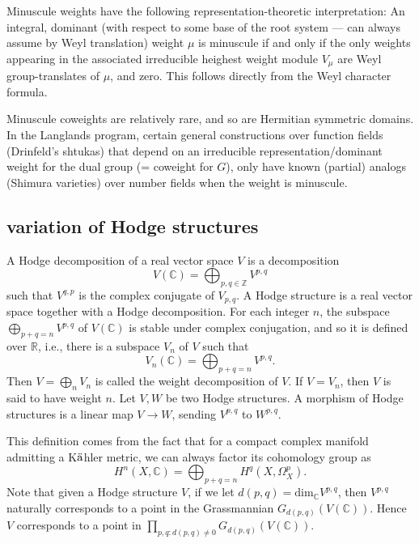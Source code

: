 \begin{remark}
 \label{remark-minuscule-coweight}
Minuscule weights have the following representation-theoretic interpretation: An integral, dominant (with respect to some base of the root system --- can always assume by Weyl translation) weight $\mu$ is minuscule if and only if the only weights appearing in the associated irreducible heighest weight module $V_\mu$ are Weyl group-translates of $\mu$, and zero. This follows directly from the Weyl character formula.

Minuscule coweights are relatively rare, and so are Hermitian symmetric domains. In the Langlands program, certain general constructions over function fields (Drinfeld's shtukas) that depend on an irreducible representation/dominant weight for the dual group (= coweight for $G$), only have known (partial) analogs (Shimura varieties) over number fields when the weight is minuscule.
\end{remark}

\subsection{variation of Hodge structures}
\label{subsection-variation-Hodge}
\begin{definition}
 \label{definition-Hodge}
 A Hodge decomposition of a real vector space $V$ is a decomposition
$$
V(\mathbb C)= \bigoplus_{p,q\in \mathbb Z} V^{p,q}
$$
such that $V^{q,p}$ is the complex conjugate of $V_{p,q}$. A Hodge structure is a real vector space together with a Hodge decomposition. For each integer $n$, the subspace $\bigoplus_{p+q=n}V^{p,q}$ of $V(\mathbb C)$ is stable under complex conjugation, and so it is defined over $\mathbb R$, i.e., there is a subspace $V_n$ of $V$ such that
$$
V_n(\mathbb C)=\bigoplus_{p+q=n}V^{p,q}.
$$
Then $V=\bigoplus_n V_n$ is called the weight decomposition of $V$. If $V=V_n$, then $V$ is said to have weight $n$. Let $V,W$ be two Hodge structures. A morphism of Hodge structures is a linear map $V \to W$, sending $V^{p,q}$ to $W^{p,q}$.
\end{definition}

\begin{remark}
 \label{remark-Hodge-structures}
 This definition comes from the fact that for a compact complex manifold admitting a K$\rm \ddot a$hler metric, we can always factor its cohomology group as
$$
H^n(X, \mathbb C)= \bigoplus _{ p+q=n}H^q(X, \Omega^p_X).
$$
Note that given a Hodge structure $V$, if we let $d(p,q)= \text{dim}_\mathbb C V^{p,q}$, then $V^{p,q}$ naturally corresponds to a point in the Grassmannian $G_{d(p,q)}(V(\mathbb C))$. Hence $V$ corresponds to a point in $\prod_{p,q:d(p,q)\ne 0} G_{d(p,q)}(V(\mathbb C))$.
\end{remark}

